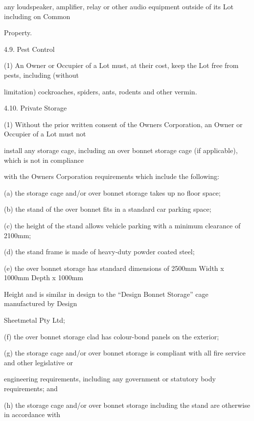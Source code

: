 \documentclass{article}
\begin{document}
{\fontsize{10.02}{1}any loudspeaker, amplifier, relay or other audio equipment outside of its Lot including on Common }

{\fontsize{10.02}{1}Property. }

{\fontsize{9.99}{1}4.9. Pest Control }

{\fontsize{9.962}{1}(1) An Owner or Occupier of a Lot must, at their cost, keep the Lot free from pests, including (without }

{\fontsize{10.02}{1}limitation) cockroaches, spiders, ants, rodents and other vermin. }

{\fontsize{9.99}{1}4.10. Private Storage }

{\fontsize{9.962}{1}(1) Without the prior written consent of the Owners Corporation, an Owner or Occupier of a Lot must not }

{\fontsize{10.02}{1}install any storage cage, including an over bonnet storage cage (if applicable), which is not in compliance }

{\fontsize{10.02}{1}with the Owners Corporation requirements which include the following: }

{\fontsize{9.962}{1}(a) the storage cage and/or over bonnet storage takes up no floor space; }

{\fontsize{9.962}{1}(b) the stand of the over bonnet fits in a standard car parking space; }

{\fontsize{9.962}{1}(c) the height of the stand allows vehicle parking with a minimum clearance of 2100mm; }

{\fontsize{9.962}{1}(d) the stand frame is made of heavy-duty powder coated steel; }

{\fontsize{9.962}{1}(e) the over bonnet storage has standard dimensions of 2500mm Width x 1000mm Depth x 1000mm }

{\fontsize{10.02}{1}Height and is similar in design to the “Design Bonnet Storage” cage manufactured by Design }

{\fontsize{10.02}{1}Sheetmetal Pty Ltd; }

{\fontsize{9.962}{1}(f) the over bonnet storage clad has colour-bond panels on the exterior; }


{\fontsize{9.962}{1}(g) the storage cage and/or over bonnet storage is compliant with all fire service and other legislative or }

{\fontsize{10.02}{1}engineering requirements, including any government or statutory body requirements; and }

{\fontsize{9.962}{1}(h) the storage cage and/or over bonnet storage including the stand are otherwise in accordance with }
\end{document}
